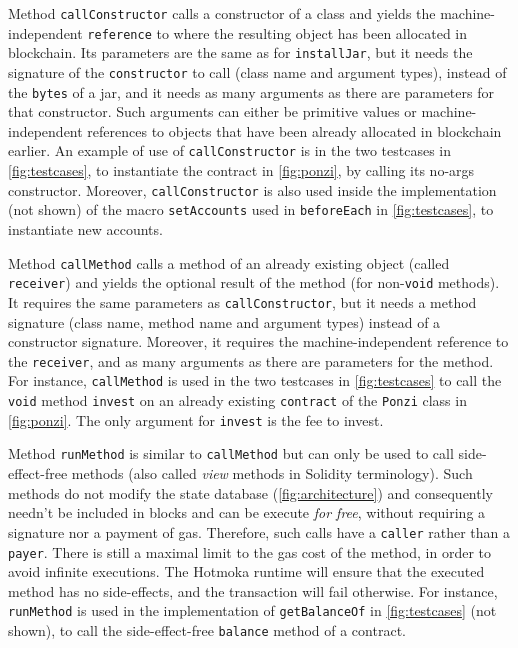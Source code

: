 Method \texttt{callConstructor} calls a constructor of a class and yields the
machine-independent \texttt{reference} to where the resulting object
has been allocated in blockchain. Its parameters are the same as for \texttt{installJar}, but it needs the
signature of the \texttt{constructor} to call (class name and argument types), instead of the \texttt{bytes}
of a jar, and it needs as many arguments as there are parameters for that constructor. Such arguments can
either be primitive values or machine-independent references to objects that have been already allocated
in blockchain earlier. An example of use of \texttt{callConstructor} is in the two testcases in
\cref{fig:testcases}, to instantiate the contract in \cref{fig:ponzi}, by calling its no-args constructor.
Moreover, \texttt{callConstructor} is also used inside the implementation (not shown) of the
macro \texttt{setAccounts} used in \texttt{beforeEach} in \cref{fig:testcases}, to instantiate new accounts.

Method \texttt{callMethod} calls a method of an already existing object (called \texttt{receiver}) and yields
the optional result of the method (for non-\texttt{void} methods). It requires the same parameters
as \texttt{callConstructor}, but it needs a method signature (class name, method name and argument types)
instead of a constructor signature. Moreover, it requires the machine-independent reference
to the \texttt{receiver}, and as many arguments as there are parameters for the method.
For instance, \texttt{callMethod} is used in the two testcases in \cref{fig:testcases} to call the
\texttt{void} method \texttt{invest} on an already existing \texttt{contract} of the \texttt{Ponzi} class
in \cref{fig:ponzi}. The only argument for \texttt{invest} is the fee to invest.

Method \texttt{runMethod} is similar to \texttt{callMethod} but can only be used to call
side-effect-free methods (also called \emph{view} methods in Solidity terminology). Such methods do not
modify the state database (\cref{fig:architecture}) and consequently needn't be included in blocks and
can be execute \emph{for free}, without requiring a signature nor a payment of gas. Therefore, such calls
have a \texttt{caller} rather than a \texttt{payer}. There is still a maximal
limit to the gas cost of the method, in order to avoid infinite executions. The Hotmoka runtime will
ensure that the executed method has no side-effects, and the transaction will fail otherwise.
For instance, \texttt{runMethod} is used in the implementation of \texttt{getBalanceOf} in \cref{fig:testcases}
(not shown), to call the side-effect-free \texttt{balance} method of a contract.

